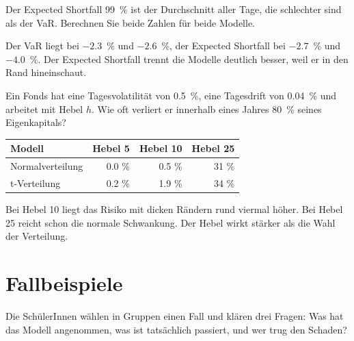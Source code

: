 \begin{mychallenge}
	Der Expected Shortfall 99~\% ist der Durchschnitt aller Tage, die schlechter sind als der \acrshort{VaR}. Berechnen Sie beide Zahlen für beide Modelle.
	\begin{myanswer}
		Der \acrshort{VaR} liegt bei $-2.3$~\% und $-2.6$~\%, der Expected Shortfall bei $-2.7$~\% und $-4.0$~\%. Der Expected Shortfall trennt die Modelle deutlich besser, weil er in den Rand hineinschaut.
	\end{myanswer}
\end{mychallenge}

\begin{mychallenge}
	Ein Fonds hat eine Tagesvolatilität von 0.5~\%, eine Tagesdrift von 0.04~\% und arbeitet mit Hebel $h$. Wie oft verliert er innerhalb eines Jahres 80~\% seines Eigenkapitals?
	\begin{myanswer}
		\begin{center}
			\small
			\begin{tabular}{@{}lrrr@{}}
				\midrule
				\textbf{Modell} & \textbf{Hebel 5} & \textbf{Hebel 10} & \textbf{Hebel 25} \\
				\midrule
				Normalverteilung & 0.0 \% & 0.5 \% & 31 \% \\
				t-Verteilung & 0.2 \% & 1.9 \% & 34 \% \\
				\midrule
			\end{tabular}
		\end{center}
		Bei Hebel 10 liegt das Risiko mit dicken Rändern rund viermal höher. Bei Hebel 25 reicht schon die normale Schwankung. Der Hebel wirkt stärker als die Wahl der Verteilung.
	\end{myanswer}
\end{mychallenge}

\section{Fallbeispiele}
Die SchülerInnen wählen in Gruppen einen Fall und klären drei Fragen: Was hat das Modell angenommen, was ist tatsächlich passiert, und wer trug den Schaden?

